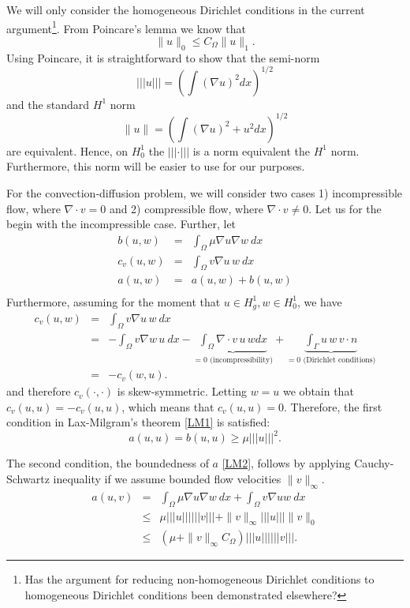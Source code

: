 \documentclass[a4paper,11pt]{amsart}
\newcommand{\norm}[1]{ |\!|\!| #1 |\!|\!|}
\begin{document}
We will only consider the homogeneous Dirichlet conditions in the current 
argument\footnote{Has the argument for reducing non-homogeneous Dirichlet conditions
to homogeneous Dirichlet conditions been demonstrated elsewhere?}.   
From Poincare's lemma we know  that 
\[
\|u\|_0 \le C_\Omega \|u\|_1.  
\]
Using Poincare, it is straightforward to show that the 
semi-norm     
\[
\norm{u} = (\int (\nabla u)^2   dx)^{1/2}  
\]
and the standard $H^1$ norm 
\[
\|u \|  = (\int (\nabla u)^2 + u^2  dx)^{1/2}  
\]
are equivalent. Hence, on $H^1_0$ the $\norm{\cdot}$ is a norm
equivalent the $H^1$ norm. Furthermore, this norm will be easier to 
use for our purposes.  

For the convection-diffusion problem, we will consider two cases 1) incompressible flow, where
$\nabla \cdot v = 0 $ and 2) compressible flow, where $\nabla \cdot v \not = 0 $.  
Let us for the begin with the incompressible case.  
Further, let 
\begin{eqnarray*}
b(u,w) &=& \int_\Omega\mu\nabla u\nabla w\ dx\\
c_v(u,w) &=& \int_\Omega v\nabla u \,w\ dx\\
a(u,w) &=& a(u,w) + b(u,w)\\
\end{eqnarray*}
Furthermore, assuming for the moment that $u \in H^1_g, w\in H^1_0$, we have  
\begin{eqnarray*}
c_v(u,w) &=& \int_\Omega v\nabla u\, w\ dx  \\ 
         &=&-\int_\Omega v\nabla w \, u\ dx 
- \underbrace{\int_\Omega \nabla \cdot v \, u \, w dx}_{= 0 \textrm{ (incompressibility)}} 
+ \underbrace{\int_\Gamma u \, w \, v \cdot n}_{ = 0  \textrm{ (Dirichlet conditions)}} \\       
         &=& - c_v(w,u) . 
\end{eqnarray*}
and therefore $c_v(\cdot, \cdot)$ is skew-symmetric. Letting $w=u$ we obtain that   
$c_v(u,u) = -c_v(u,u)$, which means that $c_v(u,u)=0$. 
Therefore, the first condition in Lax-Milgram's theorem \eqref{LM1} is satisfied:   
\[  
a(u,u) = b(u,u) \ge \mu \norm{u}^2 .  
\]

The second condition, the boundedness of $a$ \eqref{LM2}, follows by applying Cauchy-Schwartz inequality
if we assume bounded flow velocities $\|v\|_{\infty}$.  
\begin{eqnarray*}
a(u,v) &=& \int_\Omega\mu\nabla u\nabla w\ dx + \int_\Omega v\nabla uw\ dx\\
       &\le& \mu \norm{u} \norm{v}  + \|v\|_{\infty} \norm{u} \|v\|_0 \\   
       &\le& (\mu + \|v\|_{\infty} C_\Omega )  \norm{u} \norm{v} .    
\end{eqnarray*}
\end{document}

